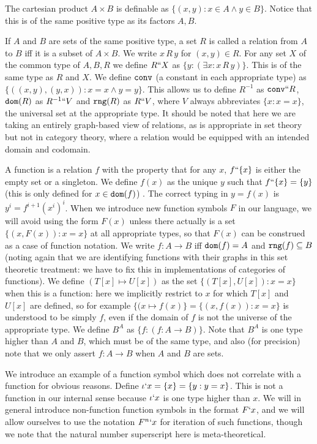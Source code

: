 \documentclass[12pt]{article}
\begin{document}
The cartesian product $A \times B$ is definable as $\{(x,y):x \in A \wedge y \in B\}$.  Notice that this is of the same positive type as its factors $A,B$.

If $A$ and $B$ are sets of the same positive type, a set $R$ is called a relation from $A$ to $B$ iff it is a subset of $A \times B$.  We write $x \,R\,y$ for $(x,y)\in R$.  For any set $X$ of the common type of $A, B, R$
we define $R``X$ as $\{y : (\exists x:x \, R\, y)\}$.  This is of the same type as $R$ and $X$.  We define ${\tt conv}$ (a constant in each appropriate type) as $\{((x,y),(y,x)):x=x \wedge y=y\}$.  This allows us to define $R^{-1}$ as ${\tt conv}``R$, ${\tt dom}(R)$ as $R^{-1}``V$ and ${\tt rng}(R)$ as $R``V$, where $V$ always abbreviates $\{x:x=x\}$, the universal set at the appropriate type.  It should be noted that here we are taking an entirely graph-based view of relations, as is appropriate in set theory but not in category theory, where a relation would be equipped with an intended domain and codomain.

A function is a relation $f$ with the property that for any $x$, $f``\{x\}$ is either the empty set or a singleton.  We define $f(x)$ as the unique $y$ such that $f``\{x\} = \{y\}$ (this is only defined for $x \in {\tt dom}(f)$) .  The correct typing in $y=f(x)$ is $y^i = f^{i+1}(x^i)^i$.  When we introduce new function symbols $F$ in our language, we will avoid using the form $F(x)$ unless there actually is a set $\{(x,F(x)):x=x\}$ at all appropriate types, so that $F(x)$ can be construed as a case of function notation.  We write $f:A \rightarrow B$ iff ${\tt dom}(f) = A$ and ${\tt rng}(f)\subseteq B$ (noting again that we are identifying functions with their graphs in this set theoretic treatment:  we have to fix this in implementations of categories of functions).  We define $(T[x] \mapsto U[x])$ as the set $\{(T[x],U[x]):x=x\}$ when this is a function:  here we implicitly restrict to $x$ for which $T[x]$ and $U[x]$ are defined, so for example $\{(x \mapsto f(x)\} = \{(x,f(x)):x=x\}$ is understood to be simply $f$, even if the domain of $f$ is not the universe of the appropriate type.  We define
$B^A$ as $\{f:(f:A \rightarrow B)\}$.  Note that $B^A$ is one type higher than $A$ and $B$, which must be of the same type, and also (for precision) note that we only
assert $f:A \rightarrow B$ when $A$ and $B$ are sets.

We introduce an example of a function symbol which does not correlate with a function for obvious reasons.  Define $\iota`x =\{x\} = \{y:y=x\}$.  This is not a function in our
internal sense because $\iota`x$ is one type higher than $x$.    We will in general introduce non-function function symbols in the format $F`x$, and we will allow ourselves to 
use the notation $F^n`x$ for iteration of such functions, though we note that the natural number superscript here is meta-theoretical.
\end{document}
